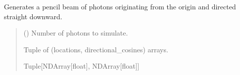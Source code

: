 \documentclass[letterpaper,10pt,english]{sphinxmanual}
\begin{document}

\begin{fulllineitems}
\label{\detokenize{generated/photon_canon.hardware:photon_canon.hardware.pencil_beams}}
\pysigstartsignatures
\pysiglinewithargsret
{}
{}
{}
\pysigstopsignatures
\sphinxAtStartPar
Generates a pencil beam of  photons originating from the origin and directed straight downward.
\begin{quote}\begin{description}
\sphinxAtStartPar
{} () \textendash{} Number of photons to simulate.

\sphinxAtStartPar
Tuple of (locations, directional\_cosines) arrays.

\sphinxAtStartPar
Tuple{[}NDArray{[}float{]}, NDArray{[}float{]}{]}

\end{description}\end{quote}

\end{fulllineitems}

\end{document}
